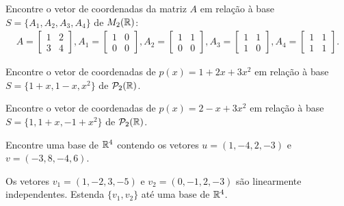 \documentclass[12pt]{exam}
\begin{document}
    \begin{exercicio}
        Encontre o vetor de coordenadas da matriz $A$ em relação à base $S = \{A_1, A_2, A_3, A_4\}$ de $M_2(\mathbb{R})$:
        \begin{align*}
            A = \begin{bmatrix}
                1 & 2\\
                3 & 4
            \end{bmatrix},
            A_1 = \begin{bmatrix}
                1 & 0\\
                0 & 0
            \end{bmatrix},
            A_2 = \begin{bmatrix}
                1 & 1\\
                0 & 0
            \end{bmatrix},
            A_3 = \begin{bmatrix}
                1 & 1\\
                1 & 0
            \end{bmatrix},
            A_4 = \begin{bmatrix}
                1 & 1\\
                1 & 1
            \end{bmatrix}.
        \end{align*}
    \end{exercicio}

    \begin{exercicio}
        Encontre o vetor de coordenadas de $p(x) = 1 + 2x + 3x^2$ em relação à base $S = \{1 + x, 1 - x, x^2\}$ de $\mathcal{P}_2(\mathbb{R})$.
    \end{exercicio}

    \begin{exercicio}
        Encontre o vetor de coordenadas de $p(x) = 2 - x + 3x^2$ em relação à base $S = \{1, 1 + x, -1 + x^2\}$ de $\mathcal{P}_2(\mathbb{R})$.
    \end{exercicio}

    \begin{exercicio}
        Encontre uma base de $\mathbb{R}^4$ contendo os vetores $u = (1, -4, 2, -3)$ e $v = (-3, 8, -4, 6)$.
    \end{exercicio}

    \begin{exercicio}
        Os vetores $v_1 = (1, -2, 3, -5)$ e $v_2 = (0, -1, 2, -3)$ são linearmente independentes. Estenda $\{v_1, v_2\}$ até uma base de $\mathbb{R}^4$.
    \end{exercicio}
\end{document}
